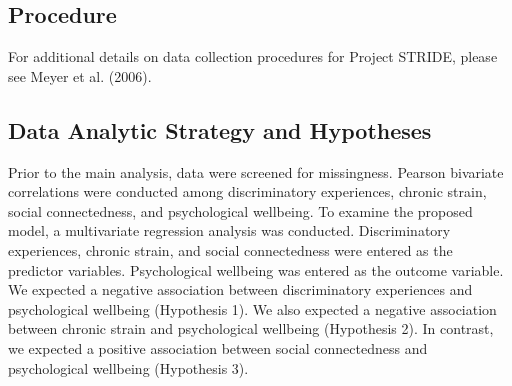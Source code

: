 \documentclass[
  english,
  man,floatsintext]{apa6}
\begin{document}
\hypertarget{procedure}{%
\subsection{Procedure}\label{procedure}}

For additional details on data collection procedures for Project STRIDE, please see Meyer et al. (2006).

\hypertarget{data-analytic-strategy-and-hypotheses}{%
\subsection{Data Analytic Strategy and Hypotheses}\label{data-analytic-strategy-and-hypotheses}}

Prior to the main analysis, data were screened for missingness. Pearson bivariate correlations were conducted among discriminatory experiences, chronic strain, social connectedness, and psychological wellbeing. To examine the proposed model, a multivariate regression analysis was conducted. Discriminatory experiences, chronic strain, and social connectedness were entered as the predictor variables. Psychological wellbeing was entered as the outcome variable. We expected a negative association between discriminatory experiences and psychological wellbeing (Hypothesis 1). We also expected a negative association between chronic strain and psychological wellbeing (Hypothesis 2). In contrast, we expected a positive association between social connectedness and psychological wellbeing (Hypothesis 3).
\end{document}
